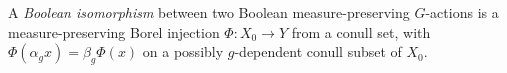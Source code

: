 
A \emph{Boolean isomorphism} between two Boolean measure-preserving $G$-actions is a measure-preserving Borel injection $\Phi:X_0\to Y$ from a conull set, with $\Phi(\alpha_gx)=\beta_g\Phi(x)$ on a possibly $g$-dependent conull subset of $X_0$.
